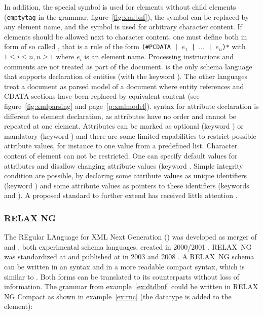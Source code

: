 In addition, the special symbol  is used for elements without child
elements (\lstinline[language=BNF]{emptytag} in the  grammar,
figure~\ref{fig:xmlbnf}), the symbol  can be replaced by any element
name, and the symbol  is used for arbitrary character content.
If  elements should be allowed next to character content, one must
define both in form of so called , that is a rule of the
form \texttt{(\#PCDATA | $e_1$ | $\ldots$ | $e_n$)*} with $1 \le i \le n, n \ge
1$ where $e_i$ is an element name.  Processing instructions and comments are
not treated as part of the document.  is the only  schema
language that supports declaration of  entities (with the keyword
). The other languages treat a document as parsed model of a
document where entity references and CDATA sections have been replaced by
equivalent content (see figure~\ref{fig:xmlparsing} and page~\ref{p:xmlmodel}).
 syntax for attribute declaration is different to element
declaration, as attributes have no order and cannot be repeated at one element.
Attributes can be marked as optional (keyword ) or mandatory
(keyword ) and there are some limited capabilities to restrict
possible attribute values, for instance to one value from a predefined list.
Character content of  element can not be restricted. One can specify
default values for attributes and disallow changing attribute values (keyword
. Simple integrity condition are possible, by declaring some
attribute values as unique identifiers (keyword ) and some attribute
values as pointers to these identifiers (keywords  and
). A proposed  standard to further extend  has
received little attention \cite{ISO19757-9}.

\subsubsection{RELAX NG}
\label{sec:relaxng}

The REgular LAnguage for XML Next Generation () was developed as
merger of  and , both experimental  schema languages,
created in 2000/2001 \cite{VanDerVlist2003}. RELAX~NG was standardized at
 and published at  in 2003 and 2008
\cite{ISO19757-2:2008}.  A RELAX~NG schema can be written in an 
syntax and in a more readable compact syntax, which is similar to
. Both forms can be translated to its counterparts
without loss of information. The grammar from example~\ref{ex:dtdbnf} could be
written in RELAX NG Compact as shown in example~\ref{ex:rnc} (the
datatype  is added to the  element):

